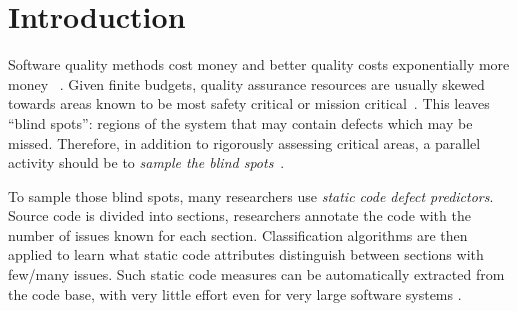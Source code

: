 \documentclass[sigconf,review, anonymous]{acmart}
\theoremstyle{break}
\theoremstyle{break}
\begin{document}




\maketitle


\section{Introduction}
\label{sect:intro}

Software quality methods cost money and better quality costs exponentially more money ~\cite{voas95, fu2016tuning}. Given finite budgets, quality assurance resources are usually 
skewed towards areas known to be most safety critical or mission critical~\cite{lowryBK98}. This leaves ``blind spots'': regions of the system that may contain defects which may be missed. Therefore, in addition to rigorously assessing  critical areas, a parallel activity should be to {\em sample the blind spots}~\cite{Menzies04}. 

To sample those blind spots, many researchers  use  {\em static code defect predictors}.
Source code is divided into sections, researchers annotate the code with the number of issues known for each section.
Classification algorithms are then applied to learn what static code attributes
distinguish 
between sections with few/many issues.
Such static code measures can be automatically extracted from
the code base, with very little effort even for very large software
systems \cite{nagappan2005static}.  
\end{document}
